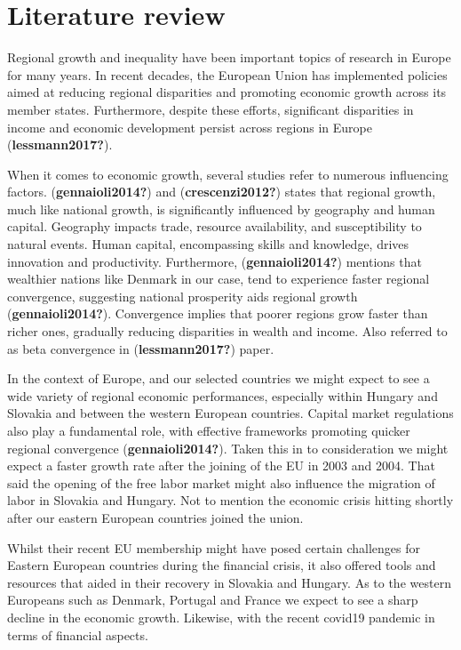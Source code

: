 \documentclass[
  a4paper,
  DIV=11,
  numbers=noendperiod]{scrartcl}
\begin{document}
\hypertarget{literature-review}{%
\section{Literature review}\label{literature-review}}

Regional growth and inequality have been important topics of research in
Europe for many years. In recent decades, the European Union has
implemented policies aimed at reducing regional disparities and
promoting economic growth across its member states. Furthermore, despite
these efforts, significant disparities in income and economic
development persist across regions in Europe (\textbf{lessmann2017?}).

When it comes to economic growth, several studies refer to numerous
influencing factors. (\textbf{gennaioli2014?}) and
(\textbf{crescenzi2012?}) states that regional growth, much like
national growth, is significantly influenced by geography and human
capital. Geography impacts trade, resource availability, and
susceptibility to natural events. Human capital, encompassing skills and
knowledge, drives innovation and productivity. Furthermore,
(\textbf{gennaioli2014?}) mentions that wealthier nations like Denmark
in our case, tend to experience faster regional convergence, suggesting
national prosperity aids regional growth (\textbf{gennaioli2014?}).
Convergence implies that poorer regions grow faster than richer ones,
gradually reducing disparities in wealth and income. Also referred to as
beta convergence in (\textbf{lessmann2017?}) paper.

In the context of Europe, and our selected countries we might expect to
see a wide variety of regional economic performances, especially within
Hungary and Slovakia and between the western European countries. Capital
market regulations also play a fundamental role, with effective
frameworks promoting quicker regional convergence
(\textbf{gennaioli2014?}). Taken this in to consideration we might
expect a faster growth rate after the joining of the EU in 2003 and
2004. That said the opening of the free labor market might also
influence the migration of labor in Slovakia and Hungary. Not to mention
the economic crisis hitting shortly after our eastern European countries
joined the union.

Whilst their recent EU membership might have posed certain challenges
for Eastern European countries during the financial crisis, it also
offered tools and resources that aided in their recovery in Slovakia and
Hungary. As to the western Europeans such as Denmark, Portugal and
France we expect to see a sharp decline in the economic growth.
Likewise, with the recent covid19 pandemic in terms of financial
aspects.
\end{document}
